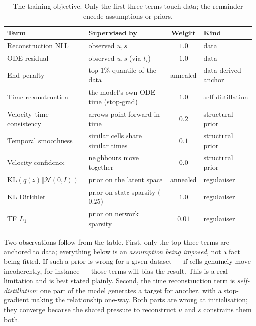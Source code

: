 \documentclass[11pt,a4paper]{article}
\newcommand{\uns}{u}
\newcommand{\spl}{s}
\theoremstyle{definition}
\begin{document}
\begin{table}[h]
\centering
\caption{The training objective. Only the first three terms touch data; the
remainder encode assumptions or priors.}
\label{tab:losses}
\small
\begin{tabular}{@{}llcl@{}}
\toprule
\textbf{Term} & \textbf{Supervised by} & \textbf{Weight} & \textbf{Kind} \\
\midrule
Reconstruction NLL          & observed $\uns, \spl$                   & $1.0$     & data \\
ODE residual                & observed $\uns, \spl$ (via $t_i$)       & $1.0$     & data \\
End penalty                 & top-$1\%$ quantile of the data        & annealed  & data-derived anchor \\
\midrule
Time reconstruction         & the model's own ODE time (stop-grad)  & $1.0$     & self-distillation \\
\midrule
Velocity--time consistency  & arrows point forward in time          & $0.2$     & structural prior \\
Temporal smoothness         & similar cells share similar times     & $0.1$     & structural prior \\
Velocity confidence         & neighbours move together              & $0.0$     & structural prior \\
\midrule
$\mathrm{KL}(q(z)\Vert\mathcal{N}(0,I))$ & prior on the latent space & annealed & regulariser \\
KL Dirichlet                & prior on state sparsity ($0.25$)      & $1.0$     & regulariser \\
TF $L_1$                    & prior on network sparsity             & $0.01$    & regulariser \\
\bottomrule
\end{tabular}
\end{table}

Two observations follow from the table. First, only the top three terms are
anchored to data; everything below is an \emph{assumption being imposed}, not a
fact being fitted. If such a prior is wrong for a given dataset --- if cells
genuinely move incoherently, for instance --- those terms will bias the result.
This is a real limitation and is best stated plainly. Second, the time
reconstruction term is \emph{self-distillation}: one part of the model
generates a target for another, with a stop-gradient making the relationship
one-way. Both parts are wrong at initialisation; they converge because the
shared pressure to reconstruct $\uns$ and $\spl$ constrains them both.
\end{document}
